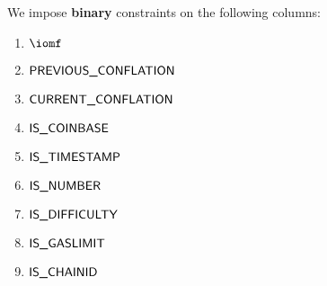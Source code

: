 We impose \textbf{binary} constraints on the following columns:
\begin{multicols}{3}
	\begin{enumerate}
		\item $\iomf$
		\item $\textsf{PREVIOUS\_CONFLATION}$
		\item $\textsf{CURRENT\_CONFLATION}$
		\item $\textsf{IS\_COINBASE}$
		\item $\textsf{IS\_TIMESTAMP}$
		\item $\textsf{IS\_NUMBER}$
		\item $\textsf{IS\_DIFFICULTY}$
		\item $\textsf{IS\_GASLIMIT}$
		\item $\textsf{IS\_CHAINID}$
	\end{enumerate}
\end{multicols}
